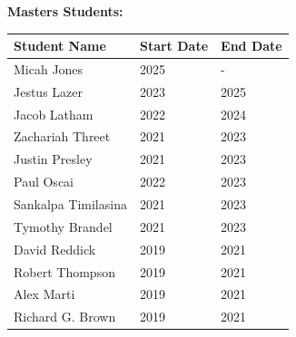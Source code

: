 \textbf{Masters Students:}
\begin{table}[!ht]
    \centering
    \begin{tabular}{|l|l|l|}
    \hline
    Student Name & Start Date & End Date \\ \hline
    Micah Jones & 2025 & - \\ \hline  
    Jestus Lazer & 2023 & 2025 \\ \hline
    Jacob Latham & 2022 & 2024 \\ \hline
    Zachariah Threet & 2021 & 2023 \\ \hline
    Justin Presley & 2021 & 2023 \\ \hline
    Paul Oscai & 2022 & 2023 \\ \hline
    Sankalpa Timilasina & 2021 & 2023 \\ \hline
    Tymothy Brandel & 2021 & 2023 \\ \hline
    David Reddick & 2019 & 2021 \\ \hline
    Robert Thompson & 2019 & 2021 \\ \hline
    Alex Marti & 2019 & 2021 \\ \hline
    Richard G. Brown & 2019 & 2021 \\ \hline
    \end{tabular}
\end{table}



